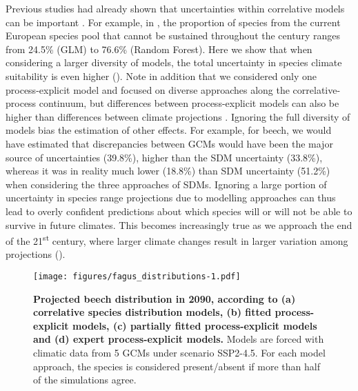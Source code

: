 \documentclass[letterpaper,8pt]{extarticle}  %
\begin{document}
\begin{doublespacing}
\begin{linenumbers}
Previous studies had already shown that uncertainties within correlative models can be important  \citep{Thuiller2019}. For example, in \citet{Wessely2024}, the proportion of species from the current European species pool that cannot be sustained throughout the century ranges from 24.5\% (GLM) to 76.6\% (Random Forest). Here we show that when considering a larger diversity of models, the total uncertainty in species climate suitability is even higher (). Note in addition that we considered only one process-explicit model and focused on diverse approaches along the correlative-process continuum, but differences between process-explicit models can also be higher than differences between climate projections \citep{Asseng2013}. Ignoring the full diversity of models bias the estimation of other effects. For example, for beech, we would have estimated that discrepancies between GCMs would have been the major source of uncertainties (39.8\%), higher than the SDM uncertainty (33.8\%), whereas it was in reality much lower (18.8\%) than SDM uncertainty (51.2\%) when considering the three approaches of SDMs. Ignoring a large portion of uncertainty in species range projections due to modelling approaches can thus lead to overly confident predictions about which species will or will not be able to survive in future climates.  This becomes increasingly true as we approach the end of the 21\textsuperscript{st} century, where larger climate changes result in larger variation among projections ().

\begin{figure}[t]
\hspace*{-2cm}
\begin{subcaptiongroup}
\label{fig:fagusA} 
\label{fig:fagusB}
\label{fig:fagusC}
\end{subcaptiongroup}
\texttt{[image: figures/fagus\_distributions-1.pdf]}
\caption{\textbf{Projected beech distribution in 2090, according to (a) correlative species distribution models, (b) fitted process-explicit models, (c) partially fitted process-explicit models and (d) expert process-explicit models.} Models are forced with climatic data from 5 GCMs under scenario SSP2-4.5. For each model approach, the species is considered present/absent if more than half of the simulations agree.}
\label{fig:fagus}
\end{figure}


\end{linenumbers}
\end{doublespacing}
\end{document}
